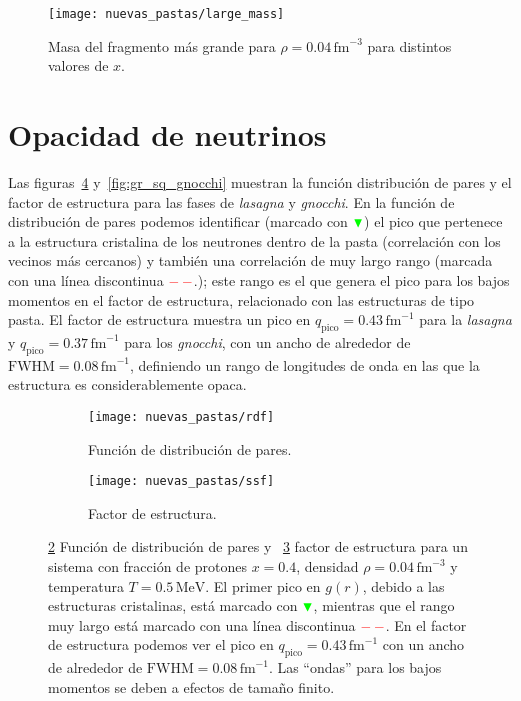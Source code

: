 \begin{figure}
  \centering
  \texttt{[image: nuevas\_pastas/large\_mass]}
  \caption{Masa del fragmento más grande para $\rho = 0.04\,\text{fm}^{-3}$ para distintos valores de $x$.}
  \label{fig:large_mass}
\end{figure}

\section{Opacidad de neutrinos}\label{sc:opacity}

Las figuras~\ref{fig:gr_sq} y~\ref{fig:gr_sq_gnocchi} muestran la función distribución de pares y el factor de estructura para las fases de \emph{lasagna} y \emph{gnocchi}.
En la función de distribución de pares podemos identificar (marcado con $\color{green} \blacktriangledown$) el pico que pertenece a la estructura cristalina de los neutrones dentro de la pasta (correlación con los vecinos más cercanos) y también una correlación de muy largo rango (marcada con una línea discontinua $\color{red}-\,-$.);
este rango es el que genera el pico para los bajos momentos en el factor de estructura, relacionado con las estructuras de tipo pasta.
El factor de estructura muestra un pico en $q_\text{pico} = 0.43\,\text{fm}^{-1}$ para la \emph{lasagna} y $q_\text{pico} = 0.37\,\text{fm}^{-1}$ para los \emph{gnocchi}, con un ancho de alrededor de
$\text{FWHM} = 0.08\,\text{fm}^{-1}$, definiendo un rango de longitudes de onda en las que la estructura es considerablemente opaca.

\begin{figure}  \centering
  \begin{subfigure}[h!]{0.45\columnwidth}
    \centering
    \texttt{[image: nuevas\_pastas/rdf]}
    \caption{Función de distribución de pares.}
      \label{sfig:gr}
  \end{subfigure}
  \begin{subfigure}[h!]{0.45\columnwidth}
    \centering
    \texttt{[image: nuevas\_pastas/ssf]}
    \caption{Factor de estructura.}
      \label{sfig:ssf}
  \end{subfigure}
  \caption{\ref{sfig:gr} Función de distribución de pares y ~\ref{sfig:ssf} factor de estructura para un sistema con fracción de protones $x=0.4$, densidad $\rho=0.04\,\text{fm}^{-3}$ y temperatura $T=0.5\,\text{MeV}$.
    El primer pico en $g(r)$, debido a las estructuras cristalinas, está marcado con $\color{green} \blacktriangledown$, mientras que el rango muy largo está marcado con una línea discontinua $\color{red}-\,-$.
    En el factor de estructura podemos ver el pico en $q_\text{pico} = 0.43\,\text{fm}^{-1}$ con un ancho de alrededor de $\text{FWHM} = 0.08\,\text{fm}^{-1}$.
    Las ``ondas'' para los bajos momentos se deben a efectos de tamaño finito.}
  \label{fig:gr_sq}
\end{figure}

